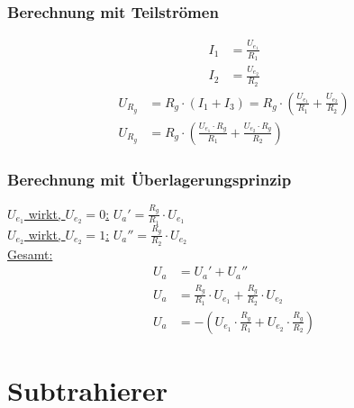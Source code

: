 \subsubsection*{Berechnung mit Teilströmen}
\begin{align}
    I_1&=\frac{U_{e_1}}{R_1} \\
    I_2&=\frac{U_{e_2}}{R_2}
\end{align}
\begin{align}   
    U_{R_g}&=R_g\cdot(I_1+I_3) =R_g\cdot(\frac{U_{e_1}}{R_1}+\frac{U_{e_2}}{R_2}) \\
    U_{R_g}&=R_g\cdot(\frac{U_{e_1}\cdot R_g}{R_1}+\frac{U_{e_2}\cdot R_g}{R_2})
\end{align}

\subsubsection*{Berechnung mit Überlagerungsprinzip}

\underline{$U_{e_1}$ wirkt, $U_{e_2}=0$:} \hspace{2cm} $U_a'=\frac{R_g}{R_1}\cdot U_{e_1}$ \\

\underline{$U_{e_2}$ wirkt, $U_{e_2}=1$:} \hspace{2cm} $U_a''=\frac{R_g}{R_2}\cdot U_{e_2}$ \\

\underline{Gesamt:}
\begin{align}  
    U_a&=U_a'+U_a''  \\
    U_a&=\frac{R_g}{R_1}\cdot U_{e_1}+\frac{R_g}{R_2}\cdot U_{e_2} \\
    U_a&=-(U_{e_1}\cdot\frac{R_g}{R_1}+U_{e_2}\cdot\frac{R_g}{R_2})
\end{align}

\newpage

\section{Subtrahierer}
